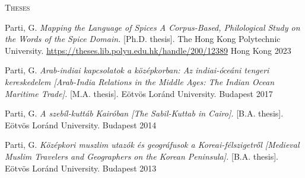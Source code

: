 \textsc{Theses}

\begin{cvhonors}

\cvhonor
{Parti, G.} %
{\textit{Mapping the Language of Spices A Corpus-Based, Philological Study on the Words of the Spice Domain.} [Ph.D. thesis]. The Hong Kong Polytechnic University. \url{https://theses.lib.polyu.edu.hk/handle/200/12389}} %
{Hong Kong} %
{2023} %

\cvhonor
{Parti, G.} %
{\textit{
Arab-indiai kapcsolatok a középkorban: Az indiai-óceáni tengeri kereskedelem [Arab-India Relations in the Middle Ages: The Indian Ocean Maritime Trade].} [M.A. thesis]. Eötvös Loránd University. \url{}} %
{Budapest} %
{2017} %

\cvhonor
{Parti, G.} %
{\textit{
  A szebíl-kuttáb Kairóban [The Sabil-Kuttab in Cairo].} [B.A. thesis]. Eötvös Loránd University. \url{}} %
{Budapest} %
{2014} %

\cvhonor
{Parti, G.} %
{\textit{
Középkori muszlim utazók és geográfusok a Koreai-félszigetről [Medieval Muslim Travelers and Geographers on the Korean Peninsula].} [B.A. thesis]. Eötvös Loránd University. \url{}} %
{Budapest} %
{2013} %

\end{cvhonors}

